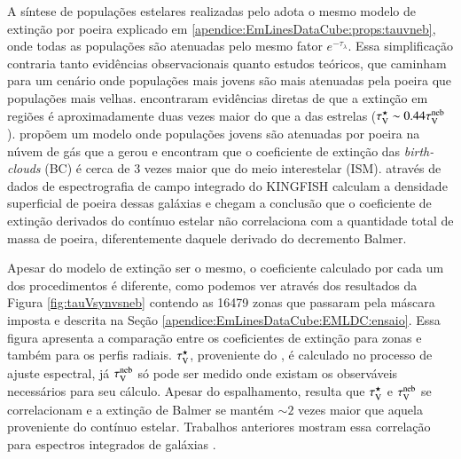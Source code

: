 A síntese de populações estelares realizadas pelo \starlight adota o mesmo modelo de extinção por poeira explicado em \ref{apendice:EmLinesDataCube:props:tauvneb}, onde todas as populações são atenuadas pelo mesmo fator $e^{-\tau_\lambda}$. Essa simplificação contraria tanto evidências observacionais quanto estudos teóricos, que caminham para um cenário onde populações mais jovens são mais atenuadas pela poeira que populações mais velhas. \citet{Calzetti.etal.1994a} encontraram evidências diretas de que a extinção em regiões \Hii é aproximadamente duas vezes maior do que a das estrelas ($\tau_{\mathrm{V}}^\star \sim 0.44 \tau_{\mathrm{V}}^{\mathrm{neb}}$). \citet{Charlot.Fall.2000a} propõem um modelo onde populações jovens são atenuadas por poeira na núvem de gás que a gerou e encontram que o coeficiente de extinção das {\em birth-clouds} (BC) é cerca de 3 vezes maior que  do meio interestelar (ISM). \citet{Kreckel.etal.2013a} através de dados de espectrografia de campo integrado do KINGFISH \citep{Kennicutt.etal.2011a} calculam a densidade superficial de poeira dessas galáxias e chegam a conclusão que o coeficiente de extinção derivados do contínuo estelar não correlaciona com a quantidade total de massa de poeira, diferentemente daquele derivado do decremento Balmer.

Apesar do modelo de extinção ser o mesmo, o coeficiente calculado por cada um dos procedimentos é diferente, como podemos ver através dos resultados da Figura \ref{fig:tauVsynvsneb} contendo as 16479 zonas que passaram pela máscara imposta e descrita na Seção \ref{apendice:EmLinesDataCube:EMLDC:ensaio}. Essa figura apresenta a comparação entre os coeficientes de extinção para zonas e também para os perfis radiais. $\tau_{\mathrm{V}}^\star$, proveniente do \starlight, é calculado no processo de ajuste espectral, já $\tau_{\mathrm{V}}^{\mathrm{neb}}$ só pode ser medido onde existam os observáveis necessários para seu cálculo. Apesar do espalhamento, resulta que $\tau_{\mathrm{V}}^\star$ e $\tau_{\mathrm{V}}^{\mathrm{neb}}$ se correlacionam e a extinção de Balmer se mantém $\sim 2$ vezes maior que aquela proveniente do contínuo estelar. Trabalhos anteriores mostram essa correlação para espectros integrados de galáxias \citep{Stasinska.etal.2004a, CidFernandes.etal.2005a, Asari.etal.2007a}.

